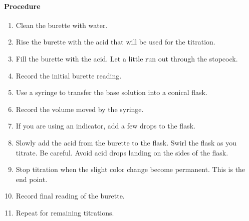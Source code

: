 \paragraph{Procedure}
\begin{enumerate}[topsep=0ex,itemsep=0ex,partopsep=1ex,parsep=1ex]
\item Clean the burette with water.
\item Rise the burette with the acid that will be used for the titration.
\item Fill the burette with the acid. Let a little run out through the stopcock.
\item Record the initial burette reading.
\item Use a syringe to transfer the base solution into a conical flask.
\item Record the volume moved by the syringe.
\item If you are using an indicator, add a few drops to the flask.
\item Slowly add the acid from the burette to the flask. Swirl the flask as you titrate. Be careful. Avoid acid drops landing on the sides of the flask.
\item Stop titration when the slight color change become permanent. This is the end point.
\item Record final reading of the burette.
\item Repeat for remaining titrations.
\end{enumerate}

